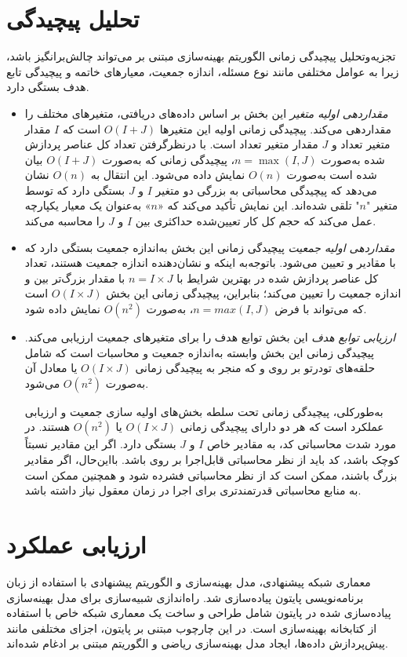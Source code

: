 \section{تحلیل پیچیدگی}
تجزیه‌وتحلیل پیچیدگی زمانی الگوریتم بهینه‌سازی مبتنی بر  می‌تواند چالش‌برانگیز باشد، زیرا به عوامل مختلفی مانند نوع مسئله، اندازه جمعیت، معیارهای خاتمه و پیچیدگی تابع هدف بستگی دارد.
\begin{itemize}
	\item \textit{مقداردهی اولیه متغیر}
	این بخش بر اساس داده‌های دریافتی، متغیرهای مختلف را مقداردهی می‌کند. پیچیدگی زمانی اولیه این متغیرها $O(I + J)$ است که $I$ مقدار متغیر تعداد   و $J$ مقدار متغیر تعداد  است. با درنظرگرفتن تعداد کل عناصر پردازش شده به‌صورت $n = \max(I, J)$، پیچیدگی زمانی که به‌صورت $O(I + J)$ بیان شده است به‌صورت $O(n)$ نمایش داده می‌شود. این انتقال به $ O(n)$ نشان می‌دهد که پیچیدگی محاسباتی به بزرگی دو متغیر $I$ و $J$ بستگی دارد که توسط متغیر "$n$" تلقی شده‌اند. این نمایش تأکید می‌کند که «$n$» به‌عنوان یک معیار یکپارچه عمل می‌کند که حجم کل کار تعیین‌شده حداکثری بین $I$ و $J$ را محاسبه می‌کند.
	\item \textit{مقداردهی اولیه جمعیت}
	پیچیدگی زمانی این بخش به‌اندازه جمعیت بستگی دارد که با مقادیر  و  تعیین می‌شود. باتوجه‌به اینکه  و  نشان‌دهنده اندازه جمعیت هستند، تعداد کل عناصر پردازش شده در بهترین شرایط با $n = I \times J$ با مقدار بزرگ‌تر بین  و  اندازه جمعیت را تعیین می‌کند؛ بنابراین، پیچیدگی زمانی این بخش $ O(I \times J)$ است که می‌تواند با فرض $n = max(I, J)$، به‌صورت $ O(n^{2})$ نمایش داده شود.
	\item \textit{ارزیابی توابع هدف}
	این بخش توابع هدف را برای متغیرهای جمعیت ارزیابی می‌کند. پیچیدگی زمانی این بخش وابسته به‌اندازه جمعیت و محاسبات است که شامل حلقه‌های تودرتو بر روی  و  که منجر به پیچیدگی زمانی $O(I \times J)$ یا معادل آن به‌صورت $ O(n^{2})$ می‌شود.
	
	
	
	به‌طورکلی، پیچیدگی زمانی تحت سلطه بخش‌های اولیه سازی جمعیت و ارزیابی عملکرد است که هر دو دارای پیچیدگی زمانی $O(I \times J)$ یا $ O(n^{2})$ هستند. در مورد شدت محاسباتی کد، به مقادیر خاص $I$ و $J$ بستگی دارد. اگر این مقادیر نسبتاً کوچک باشد، کد باید از نظر محاسباتی قابل‌اجرا بر روی  باشد. بااین‌حال، اگر مقادیر بزرگ باشند، ممکن است کد از نظر محاسباتی فشرده شود و همچنین ممکن است به منابع محاسباتی قدرتمندتری برای اجرا در زمان معقول نیاز داشته باشد.
	
\end{itemize}
\section{ارزیابی عملکرد}
معماری شبکه پیشنهادی، مدل بهینه‌سازی و الگوریتم پیشنهادی با استفاده از زبان برنامه‌نویسی پایتون پیاده‌سازی شد. راه‌اندازی شبیه‌سازی برای مدل بهینه‌سازی پیاده‌سازی شده در پایتون شامل طراحی و ساخت یک معماری شبکه خاص با استفاده از کتابخانه بهینه‌سازی  \cite{hart2011pyomo} است. در این چارچوب مبتنی بر پایتون، اجزای مختلفی مانند پیش‌پردازش داده‌ها، ایجاد مدل بهینه‌سازی ریاضی و الگوریتم مبتنی بر  ادغام شده‌اند.
